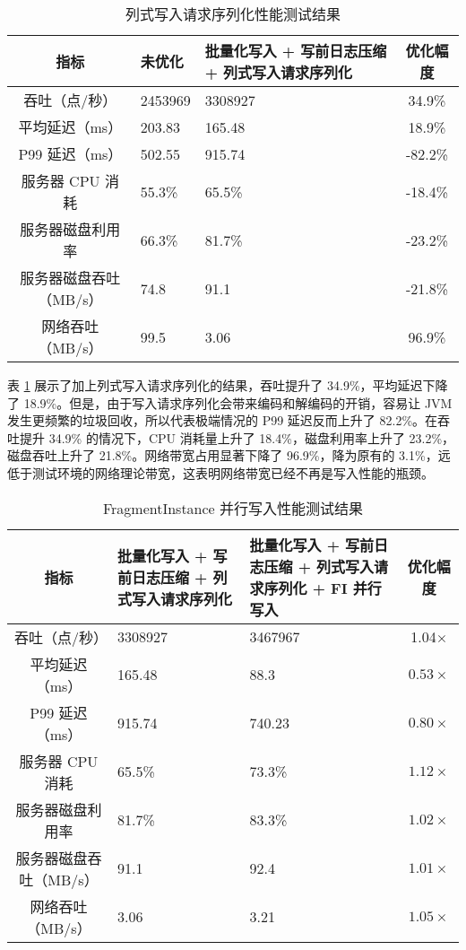 \begin{table}
  \centering
  \caption{列式写入请求序列化性能测试结果}
  \begin{tabular}{cp{3.5cm}p{3.5cm}c}
    \toprule 
    指标 &  未优化 & 批量化写入 + 写前日志压缩 + 列式写入请求序列化 & 优化幅度 \\
    \midrule
    吞吐（点/秒） & 2453969 & 	3308927 & 34.9\%\\
    平均延迟（ms） & 203.83 & 	165.48 & 18.9\%\\
    P99 延迟（ms） & 502.55 & 	915.74 & -82.2\% \\
    服务器 CPU 消耗 & 55.3\% & 	65.5\% & -18.4\%\\
    服务器磁盘利用率 & 66.3\% & 	81.7\% & -23.2\%\\
    服务器磁盘吞吐（MB/s） & 74.8 & 	91.1 & -21.8\% \\
    网络吞吐（MB/s） & 99.5 & 	3.06 & 96.9\%\\
    \bottomrule 
  \end{tabular}
  \label{tabular:columnar-serialization-performance}
\end{table}

表 \ref{tabular:columnar-serialization-performance} 展示了加上列式写入请求序列化的结果，吞吐提升了 34.9\%，平均延迟下降了 18.9\%。但是，由于写入请求序列化会带来编码和解编码的开销，容易让 JVM 发生更频繁的垃圾回收，所以代表极端情况的 P99 延迟反而上升了 82.2\%。在吞吐提升 34.9\% 的情况下，CPU 消耗量上升了 18.4\%，磁盘利用率上升了 23.2\%，磁盘吞吐上升了 21.8\%。网络带宽占用显著下降了 96.9\%，降为原有的 3.1\%，远低于测试环境的网络理论带宽，这表明网络带宽已经不再是写入性能的瓶颈。

\begin{table}
  \centering
  \caption{FragmentInstance 并行写入性能测试结果}
  \begin{tabular}{cp{3.5cm}p{3.5cm}c}
    \toprule 
    指标 &   批量化写入 + 写前日志压缩 + 列式写入请求序列化 & 批量化写入 + 写前日志压缩 + 列式写入请求序列化 + FI 并行写入 & 优化幅度 \\
    \midrule
    吞吐（点/秒） & 	3308927 & 3467967 & 1.04$\times$\\
    平均延迟（ms） &  	165.48 & 88.3 & $0.53\times$\\
    P99 延迟（ms） & 	915.74 & 740.23 & $0.80\times$ \\
    服务器 CPU 消耗 &  	65.5\% &73.3\% & $1.12\times$\\
    服务器磁盘利用率 & 	81.7\% & 83.3\% & $1.02\times$\\
    服务器磁盘吞吐（MB/s） & 91.1 & 92.4 & $1.01\times$ \\
    网络吞吐（MB/s） & 	3.06 &3.21 & $1.05\times$\\
    \bottomrule 
  \end{tabular}
  \label{tabular:fi-parallel-insert-performance}
\end{table}

